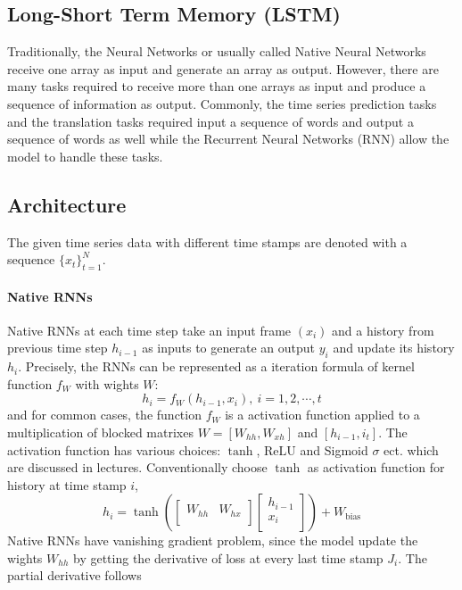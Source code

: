 \begin{multicols}{2}
\section{Long-Short Term Memory (LSTM)}
Traditionally, the Neural Networks or usually called 
Native Neural Networks receive one array as input and 
generate an array as output.
However, there are many tasks required to receive more than one arrays 
as input and produce a sequence of information as output. 
Commonly, the time series prediction tasks and the translation tasks 
required input a sequence of words and output 
a sequence of words as well while the
Recurrent Neural Networks (RNN) allow the model to handle these tasks.
\subsection{Architecture}
The given time series data with different time stamps are denoted with 
a sequence $\{x_t\}_{t=1}^{N}$.
\paragraph{Native RNNs}
Native RNNs at each time step take an input frame $(x_i)$ and 
a history from previous time step $h_{i-1}$ as inputs to 
generate an output $y_i$ and update its history $h_i$. 
Precisely, the RNNs can be represented as a iteration formula of 
kernel function $f_W$ with wights $W$: 
\begin{equation}\label{EQ: 2.1}
    h_i = f_W(h_{i-1}, x_i), \: i = 1, 2, \cdots, t    
\end{equation}
and for common cases, the function $f_W$ is a activation function 
applied to a multiplication of blocked matrixes 
$W = [W_{hh}, W_{xh}]$ and $[h_{i-1}, i_t]$. 
The activation function has various choices: 
$\tanh$, $\text{ReLU}$ and Sigmoid $\sigma$ ect. which are discussed
in lectures. 
Conventionally choose $\tanh$ as activation function for history at time 
stamp $i$, 
\[
    h_i = 
    \tanh
    \left(
        \begin{bmatrix}
            W_{hh} & W_{hx} \\
        \end{bmatrix}
        \begin{bmatrix}
            h_{i-1} \\ x_i \\
        \end{bmatrix}
    \right) + W_{\text{bias}}
\]
Native RNNs have vanishing gradient problem, since the model 
update the wights $W_{hh}$ by getting the derivative of loss at 
every last time stamp $J_i$.
The partial derivative follows 


\end{multicols}
